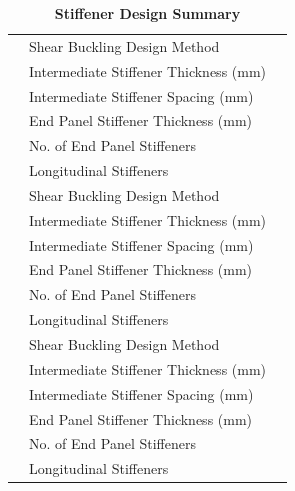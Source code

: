 \documentclass[12pt,a4paper]{report}
\numberwithin{table}{chapter}
\numberwithin{figure}{chapter}
\begin{document}
\vspace{1em}
\begin{longtable}{|C{2.5cm}|L{6.5cm}|>{\arraybackslash}p{6.5cm}|}
\caption{\textbf{Stiffener Design Summary}}
\hline
{} & \textnormal{Shear Buckling Design Method} &  \\[6pt]
 & \textnormal{Intermediate Stiffener Thickness (mm)} &  \\[6pt]
 & \textnormal{Intermediate Stiffener Spacing (mm)} &  \\[6pt]
 & \textnormal{End Panel Stiffener Thickness (mm)} &  \\[6pt]
 & \textnormal{No. of End Panel Stiffeners} &  \\[6pt]
 & \textnormal{Longitudinal Stiffeners} &  \\[6pt]
\hline
{} & \textnormal{Shear Buckling Design Method} &  \\[6pt]
 & \textnormal{Intermediate Stiffener Thickness (mm)} &  \\[6pt]
 & \textnormal{Intermediate Stiffener Spacing (mm)} &  \\[6pt]
 & \textnormal{End Panel Stiffener Thickness (mm)} &  \\[6pt]
 & \textnormal{No. of End Panel Stiffeners} &  \\[6pt]
 & \textnormal{Longitudinal Stiffeners} &  \\[6pt]
\hline
{} & \textnormal{Shear Buckling Design Method} &  \\[6pt]
 & \textnormal{Intermediate Stiffener Thickness (mm)} &  \\[6pt]
 & \textnormal{Intermediate Stiffener Spacing (mm)} &  \\[6pt]
 & \textnormal{End Panel Stiffener Thickness (mm)} &  \\[6pt]
 & \textnormal{No. of End Panel Stiffeners} &  \\[6pt]
 & \textnormal{Longitudinal Stiffeners} &  \\[6pt]
\hline
\end{longtable}

\vspace{1em}
\end{document}

